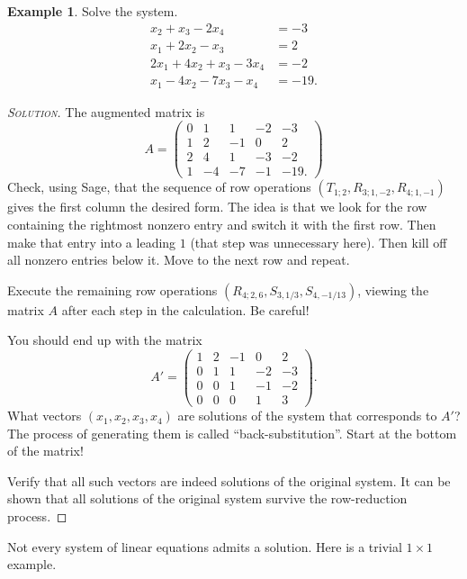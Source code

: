 \documentclass[12pt]{exam}
\theoremstyle{definition}
\newtheorem{example}{Example}
\begin{document}
\begin{example}
    Solve the system.
    \begin{align*}
        x_2 + x_3 - 2x_4 &= -3 \\
        x_1 + 2x_2 - x_3 &= 2 \\
        2x_1 + 4x_2 + x_3 - 3x_4 &= -2 \\
        x_1 - 4x_2 - 7x_3 - x_4 &= -19.
    \end{align*}
\end{example}
\begin{proof}[\textsc{Solution}]
    The augmented matrix is 
    \[
        A = \begin{pmatrix}
            0 & 1  & 1  & -2 & -3   \\
            1 & 2  & -1 & 0  & 2    \\
            2 & 4  & 1  & -3 & -2   \\
            1 & -4 & -7 & -1 & -19.
        \end{pmatrix}
    \]
    Check, using Sage, that the sequence of row operations $(T_{1;2}, R_{3;1,-2}, R_{4;1,-1})$ gives the first column the desired form. The idea is that we look for the row containing the rightmost nonzero entry and switch it with the first row. Then make that entry into a leading $1$ (that step was unnecessary here). Then kill off all nonzero entries below it. Move to the next row and repeat.

    Execute the remaining row operations $(R_{4;2,6}, S_{3,1/3}, S_{4,-1/13})$, viewing the matrix $A$ after each step in the calculation. Be careful!

    You should end up with the matrix
    \[
        A' = \begin{pmatrix}
            1 & 2 & -1 & 0 & 2 \\
            0 & 1 & 1 & -2 & -3 \\
            0 & 0 & 1 & -1 & -2 \\
            0 & 0 & 0 & 1 & 3
        \end{pmatrix}.
    \]
    What vectors $(x_1, x_2, x_3, x_4)$ are solutions of the system that corresponds to $A'$? The process of generating them is called ``back-substitution''. Start at the bottom of the matrix! 

    Verify that all such vectors are indeed solutions of the original system. It can be shown that all solutions of the original system survive the row-reduction process.
\end{proof}
Not every system of linear equations admits a solution. Here is a trivial $1 \times 1$ example.
\end{document}
